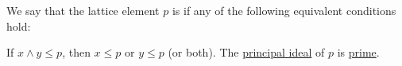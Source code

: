 \begin{definition}\label{def:lattice_prime_element}
  We say that the lattice element \( p \) is  if any of the following equivalent conditions hold:
  \begin{thmenum}
     If \( x \wedge y \leq p \), then \( x \leq p \) or \( y \leq p \) (or both).
     The \hyperref[def:lattice_ideal/principal]{principal ideal} of \( p \) is \hyperref[def:lattice_ideal/prime]{prime}.
  \end{thmenum}
\end{definition}
